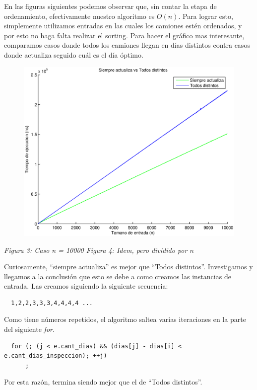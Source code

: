 En las figuras siguientes podemos observar que, sin contar la etapa de ordenamiento, efectivamente nuestro algoritmo es $O(n)$. Para lograr esto, simplemente utilizamos entradas en las cuales los camiones estén ordenados, y por esto no haga falta realizar el sorting. Para hacer el gráfico mas interesante, comparamos casos donde todos los camiones llegan en días distintos contra casos donde actualiza seguido cuál es el día óptimo.

  \begin{figure}[H]
    \includegraphics[width=0.5\linewidth]{problema1/graficos/problema1_ordenada_siempre_actualiza_10000_vs_problema1_ordenada_todos_distintos_10000.eps}
\end{figure}
\emph{\hspace{2,5cm}Figura 3: Caso n = 10000 \hspace{3cm}Figura 4: Idem, pero dividido por $n$}

Curiosamente, ``siempre actualiza'' es mejor que ``Todos distintos''. Investigamos y llegamos a la conclusión que esto se debe a como creamos las instancias de entrada. Las creamos siguiendo la siguiente secuencia:

\begin{verbatim}
  1,2,2,3,3,3,4,4,4,4 ...
\end{verbatim}

Como tiene números repetidos, el algoritmo saltea varias iteraciones en la parte del siguiente \emph{for}.

\begin{verbatim}
  for (; (j < e.cant_dias) && (dias[j] - dias[i] < e.cant_dias_inspeccion); ++j)
      ;
\end{verbatim}

Por esta razón, termina siendo mejor que el de ``Todos distintos''.

